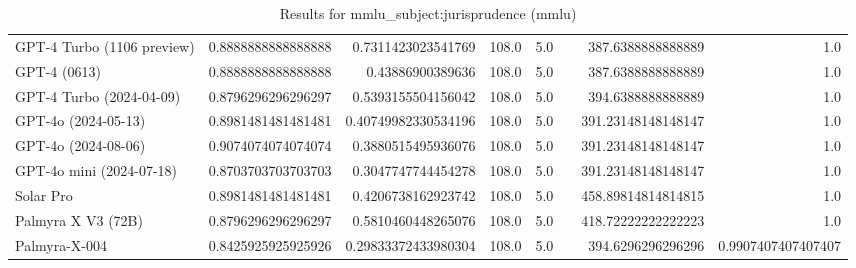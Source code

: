 \begin{table}[htp]
{\begin{tabular}{lrrrrrrr}
GPT-4 Turbo (1106 preview) & 0.8888888888888888 & 0.7311423023541769 & 108.0 & 5.0 &  & 387.6388888888889 & 1.0 \\
GPT-4 (0613) & 0.8888888888888888 & 0.43886900389636 & 108.0 & 5.0 &  & 387.6388888888889 & 1.0 \\
GPT-4 Turbo (2024-04-09) & 0.8796296296296297 & 0.5393155504156042 & 108.0 & 5.0 &  & 394.6388888888889 & 1.0 \\
GPT-4o (2024-05-13) & 0.8981481481481481 & 0.40749982330534196 & 108.0 & 5.0 &  & 391.23148148148147 & 1.0 \\
GPT-4o (2024-08-06) & 0.9074074074074074 & 0.3880515495936076 & 108.0 & 5.0 &  & 391.23148148148147 & 1.0 \\
GPT-4o mini (2024-07-18) & 0.8703703703703703 & 0.3047747744454278 & 108.0 & 5.0 &  & 391.23148148148147 & 1.0 \\
Solar Pro & 0.8981481481481481 & 0.4206738162923742 & 108.0 & 5.0 &  & 458.89814814814815 & 1.0 \\
Palmyra X V3 (72B) & 0.8796296296296297 & 0.5810460448265076 & 108.0 & 5.0 &  & 418.72222222222223 & 1.0 \\
Palmyra-X-004 & 0.8425925925925926 & 0.29833372433980304 & 108.0 & 5.0 &  & 394.6296296296296 & 0.9907407407407407 \\
\bottomrule
\end{tabular}}
\caption{Results for mmlu_subject:jurisprudence (mmlu)}
\label{fig:mmlu_subject:jurisprudence (mmlu)}
\end{table}